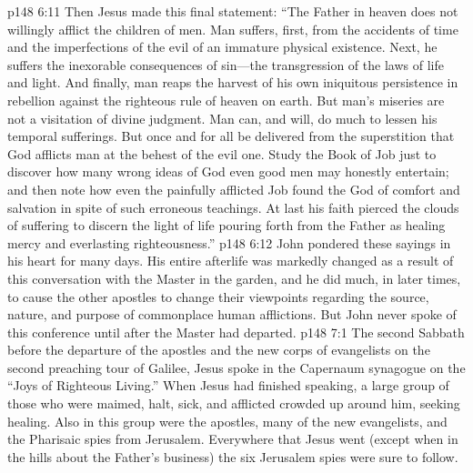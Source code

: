 \vs p148 6:11 Then Jesus made this final statement: \textcolor{ubdarkred}{“The Father in heaven does not willingly afflict the children of men. Man suffers, first, from the accidents of time and the imperfections of the evil of an immature physical existence. Next, he suffers the inexorable consequences of sin---the transgression of the laws of life and light. And finally, man reaps the harvest of his own iniquitous persistence in rebellion against the righteous rule of heaven on earth. But man’s miseries are not a  visitation of divine judgment. Man can, and will, do much to lessen his temporal sufferings. But once and for all be delivered from the superstition that God afflicts man at the behest of the evil one. Study the Book of Job just to discover how many wrong ideas of God even good men may honestly entertain; and then note how even the painfully afflicted Job found the God of comfort and salvation in spite of such erroneous teachings. At last his faith pierced the clouds of suffering to discern the light of life pouring forth from the Father as healing mercy and everlasting righteousness.”}
\vs p148 6:12 John pondered these sayings in his heart for many days. His entire afterlife was markedly changed as a result of this conversation with the Master in the garden, and he did much, in later times, to cause the other apostles to change their viewpoints regarding the source, nature, and purpose of commonplace human afflictions. But John never spoke of this conference until after the Master had departed.
\vs p148 7:1 The second Sabbath before the departure of the apostles and the new corps of evangelists on the second preaching tour of Galilee, Jesus spoke in the Capernaum synagogue on the \textcolor{ubdarkred}{“Joys of Righteous Living.”} When Jesus had finished speaking, a large group of those who were maimed, halt, sick, and afflicted crowded up around him, seeking healing. Also in this group were the apostles, many of the new evangelists, and the Pharisaic spies from Jerusalem. Everywhere that Jesus went (except when in the hills about the Father’s business) the six Jerusalem spies were sure to follow.
